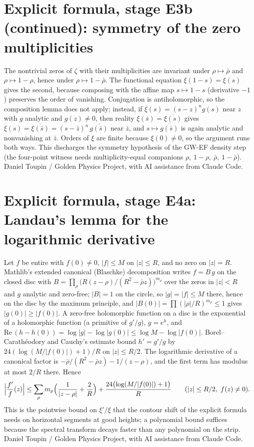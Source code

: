 \documentclass{report}
\theoremstyle{definition}
\begin{document}
\begin{itemize}
\begin{itemize}
\section{Explicit formula, stage E3b (continued): symmetry of the zero multiplicities}
The nontrivial zeros of $\zeta$ with their multiplicities are invariant under $\rho\mapsto\bar\rho$ and $\rho\mapsto1-\rho$, hence under $\rho\mapsto1-\bar\rho$. The functional equation $\xi(1-s)=\xi(s)$ gives the second, because composing with the affine map $s\mapsto1-s$ (derivative $-1$) preserves the order of vanishing. Conjugation is antiholomorphic, so the composition lemma does not apply; instead, if $\xi(s)=(s-z)^n g(s)$ near $z$ with $g$ analytic and $g(z)\ne0$, then reality $\xi(\bar s)=\overline{\xi(s)}$ gives $\xi(s)=\overline{\xi(\bar s)}=(s-\bar z)^n\,\overline{g(\bar s)}$ near $\bar z$, and $s\mapsto\overline{g(\bar s)}$ is again analytic and nonvanishing at $\bar z$. Orders of $\xi$ are finite because $\xi(0)\ne0$, so the argument runs both ways. This discharges the symmetry hypothesis of the GW-EF density step (the four-point witness needs multiplicity-equal companions $\rho,\ 1-\rho,\ \bar\rho,\ 1-\bar\rho$).
Daniel Toupin / Golden Physics Project, with AI assistance from Claude Code.


\section{Explicit formula, stage E4a: Landau's lemma for the logarithmic derivative}
Let $f$ be entire with $f(0)\ne0$, $|f|\le M$ on $|z|\le R$, and no zero on $|z|=R$. Mathlib's extended canonical (Blaschke) decomposition writes $f=B\,g$ on the closed disc with $B=\prod_\rho\bigl(R(z-\rho)/(R^2-\bar\rho z)\bigr)^{m_\rho}$ over the zeros in $|z|<R$ and $g$ analytic and zero-free; $|B|=1$ on the circle, so $|g|=|f|\le M$ there, hence on the disc by the maximum principle, and $|B(0)|=\prod(|\rho|/R)^{m_\rho}\le1$ gives $|g(0)|\ge|f(0)|$. A zero-free holomorphic function on a disc is the exponential of a holomorphic function (a primitive of $g'/g$), $g=e^{h}$, and $\mathrm{Re}\,(h-h(0))=\log|g|-\log|g(0)|\le\log M-\log|f(0)|$. Borel--Carath\'eodory and Cauchy's estimate bound $h'=g'/g$ by $24(\log(M/|f(0)|)+1)/R$ on $|z|\le R/2$. The logarithmic derivative of a canonical factor is $-\bar\rho/(R^2-\bar\rho z)-1/(z-\rho)$, and the first term has modulus at most $2/R$ there. Hence
\[
\Bigl|\frac{f'}{f}(z)\Bigr|\le\sum_\rho m_\rho\Bigl(\frac1{|z-\rho|}+\frac2R\Bigr)+\frac{24\bigl(\log(M/|f(0)|)+1\bigr)}{R}\qquad(|z|\le R/2,\ f(z)\ne0).
\]
This is the pointwise bound on $\xi'/\xi$ that the contour shift of the explicit formula needs on horizontal segments at good heights; a polynomial bound suffices because the spectral transform decays faster than any polynomial on the strip.
Daniel Toupin / Golden Physics Project, with AI assistance from Claude Code.



\end{itemize}
\end{itemize}
\end{document}
